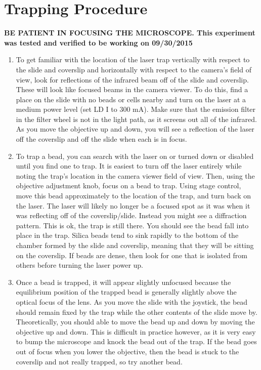 \documentclass{../lab}
\begin{document}
\section{Trapping Procedure}

\textbf{BE PATIENT IN FOCUSING THE MICROSCOPE. This experiment was tested and verified to be working on 09/30/2015}

\begin{enumerate}
    \item To get familiar with the location of the laser trap vertically with respect to the slide and coverslip and horizontally with respect to the camera's field of view, look for reflections of the infrared beam off of the slide and coverslip. These will look like focused beams in the camera viewer. To do this, find a place on the slide with no beads or cells nearby and turn on the laser at a medium power level (set LD I to 300 mA). Make sure that the emission filter in the filter wheel is not in the light path, as it screens out all of the infrared. As you move the objective up and down, you will see a reflection of the laser off the coverslip and off the slide when each is in focus.

    \item To trap a bead, you can search with the laser on or turned down or disabled until you find one to trap. It is easiest to turn off the laser entirely while noting the trap's location in the camera viewer field of view. Then, using the objective adjustment knob, focus on a bead to trap. Using stage control, move this bead approximately to the location of the trap, and turn back on the laser. The laser will likely no longer be a focused spot as it was when it was reflecting off of the coverslip/slide. Instead you might see a diffraction pattern. This is ok, the trap is still there. You should see the bead fall into place in the trap. Silica beads tend to sink rapidly to the bottom of the chamber formed by the slide and coverslip, meaning that they will be sitting on the coverslip. If beads are dense, then look for one that is isolated from others before turning the laser power up.

    \item Once a bead is trapped, it will appear slightly unfocused because the equilibrium position of the trapped bead is generally slightly above the optical focus of the lens. As you move the slide with the joystick, the bead should remain fixed by the trap while the other contents of the slide move by. Theoretically, you should able to move the bead up and down by moving the objective up and down. This is difficult in practice however, as it is very easy to bump the microscope and knock the bead out of the trap. If the bead goes out of focus when you lower the objective, then the bead is stuck to the coverslip and not really trapped, so try another bead.


\end{enumerate}
\end{document}

